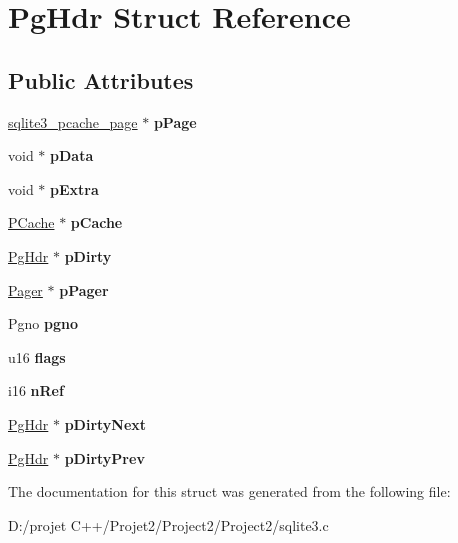 \hypertarget{struct_pg_hdr}{}\section{Pg\+Hdr Struct Reference}
\label{struct_pg_hdr}
\subsection*{Public Attributes}
\begin{DoxyCompactItemize}
\item 
\mbox{\label{struct_pg_hdr_aa5645976ba0634993a7304dce8856c8b}} 
\mbox{\hyperlink{structsqlite3__pcache__page}{sqlite3\+\_\+pcache\+\_\+page}} $\ast$ {\bfseries p\+Page}
\item 
\mbox{\label{struct_pg_hdr_a0f9f2ac8492c0cdad5898036db20b798}} 
void $\ast$ {\bfseries p\+Data}
\item 
\mbox{\label{struct_pg_hdr_a8ff7430ed04077f1ae20d10801968164}} 
void $\ast$ {\bfseries p\+Extra}
\item 
\mbox{\label{struct_pg_hdr_a557aeaddd1b0805815ce06f1bfd27782}} 
\mbox{\hyperlink{struct_p_cache}{P\+Cache}} $\ast$ {\bfseries p\+Cache}
\item 
\mbox{\label{struct_pg_hdr_a7732b1c0f19d9555ac93d4879fc95bbd}} 
\mbox{\hyperlink{struct_pg_hdr}{Pg\+Hdr}} $\ast$ {\bfseries p\+Dirty}
\item 
\mbox{\label{struct_pg_hdr_aaa4879a9510c8a819a1e10a8ee21495b}} 
\mbox{\hyperlink{struct_pager}{Pager}} $\ast$ {\bfseries p\+Pager}
\item 
\mbox{\label{struct_pg_hdr_ab6e2223e410acf9bae7f12f1b1293589}} 
Pgno {\bfseries pgno}
\item 
\mbox{\label{struct_pg_hdr_a8ef58380f7e04f1e3c76fa208e227f95}} 
u16 {\bfseries flags}
\item 
\mbox{\label{struct_pg_hdr_ac68c685d117788c18849e8853dd419d5}} 
i16 {\bfseries n\+Ref}
\item 
\mbox{\label{struct_pg_hdr_a61b56eb694ce445799963f7eb912e367}} 
\mbox{\hyperlink{struct_pg_hdr}{Pg\+Hdr}} $\ast$ {\bfseries p\+Dirty\+Next}
\item 
\mbox{\label{struct_pg_hdr_a8392b45bb05d88c734020beb912304dc}} 
\mbox{\hyperlink{struct_pg_hdr}{Pg\+Hdr}} $\ast$ {\bfseries p\+Dirty\+Prev}
\end{DoxyCompactItemize}


The documentation for this struct was generated from the following file\+:\begin{DoxyCompactItemize}
\item 
D\+:/projet C++/\+Projet2/\+Project2/\+Project2/sqlite3.\+c\end{DoxyCompactItemize}
